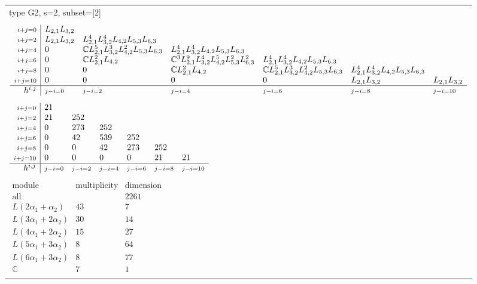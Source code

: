 \documentclass[crop,border=2mm]{standalone}
\begin{document}
\begin{tabular}{l}
{\huge type G2, s=2, subset=[2]}\\ \\


$\displaystyle
\begin{array}{r|l l l l l l}
	{\scriptstyle i+j=0}&L_{2,1}L_{3,2}&&&&&\\
	{\scriptstyle i+j=2}&L_{2,1}L_{3,2}&L_{2,1}^{4}L_{3,2}^{4}L_{4,2}L_{5,3}L_{6,3}&&&&\\
	{\scriptstyle i+j=4}&0&\mathbb{C}L_{2,1}^{5}L_{3,2}^{3}L_{4,2}^{2}L_{5,3}L_{6,3}&L_{2,1}^{4}L_{3,2}^{4}L_{4,2}L_{5,3}L_{6,3}&&&\\
	{\scriptstyle i+j=6}&0&\mathbb{C}L_{2,1}^{2}L_{4,2}&\mathbb{C}^{3}L_{2,1}^{9}L_{3,2}^{4}L_{4,2}^{5}L_{5,3}^{2}L_{6,3}^{2}&L_{2,1}^{4}L_{3,2}^{4}L_{4,2}L_{5,3}L_{6,3}&&\\
	{\scriptstyle i+j=8}&0&0&\mathbb{C}L_{2,1}^{2}L_{4,2}&\mathbb{C}L_{2,1}^{5}L_{3,2}^{3}L_{4,2}^{2}L_{5,3}L_{6,3}&L_{2,1}^{4}L_{3,2}^{4}L_{4,2}L_{5,3}L_{6,3}&\\
	{\scriptstyle i+j=10}&0&0&0&0&L_{2,1}L_{3,2}&L_{2,1}L_{3,2}\\
	\hline h^{i,j}&{\scriptstyle j-i=0}&{\scriptstyle j-i=2}&{\scriptstyle j-i=4}&{\scriptstyle j-i=6}&{\scriptstyle j-i=8}&{\scriptstyle j-i=10}
\end{array}
$ \\ \\


$\displaystyle
\begin{array}{r|l l l l l l}
	{\scriptstyle i+j=0}&21&&&&&\\
	{\scriptstyle i+j=2}&21&252&&&&\\
	{\scriptstyle i+j=4}&0&273&252&&&\\
	{\scriptstyle i+j=6}&0&42&539&252&&\\
	{\scriptstyle i+j=8}&0&0&42&273&252&\\
	{\scriptstyle i+j=10}&0&0&0&0&21&21\\
	\hline h^{i,j}&{\scriptstyle j-i=0}&{\scriptstyle j-i=2}&{\scriptstyle j-i=4}&{\scriptstyle j-i=6}&{\scriptstyle j-i=8}&{\scriptstyle j-i=10}
\end{array}
$ \\ \\


$\displaystyle
\begin{array}{rll}
	\text{module}&\text{multiplicity}&\text{dimension} \\ \hline \text{all}&&2261 \\
	L\left( 2\alpha_{1}+\alpha_{2}\right)&43&7\\
	L\left( 3\alpha_{1}+ 2\alpha_{2}\right)&30&14\\
	L\left( 4\alpha_{1}+ 2\alpha_{2}\right)&15&27\\
	L\left( 5\alpha_{1}+ 3\alpha_{2}\right)&8&64\\
	L\left( 6\alpha_{1}+ 3\alpha_{2}\right)&8&77\\
	\mathbb{C}&7&1
\end{array}
$ \\ \\

\end{tabular}
\end{document}
